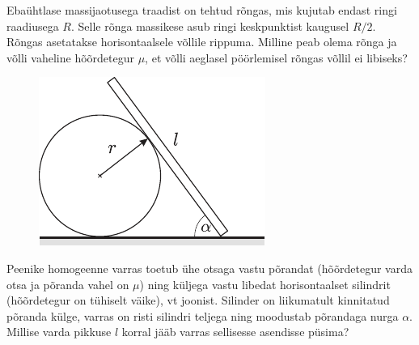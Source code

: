 \documentclass[10pt, twoside]{article}
\begin{document}
{%

Ebaühtlase massijaotusega traadist on tehtud rõngas, mis kujutab endast ringi raadiusega $R$. Selle rõnga massikese asub ringi keskpunktist
kaugusel $R/2$. Rõngas asetatakse horisontaalsele võllile rippuma. Milline peab
olema rõnga ja võlli vaheline hõõrdetegur $\mu$, et võlli aeglasel pöörlemisel rõngas
võllil ei libiseks?
\probend
\bigskip


\begin{figure}
	\begin{center}
		\vspace{-25pt}
		\includegraphics[width=\linewidth]{2008-v3g-09-yl}
	\end{center}
\end{figure}
Peenike homogeenne varras toetub ühe otsaga vastu põrandat (hõõrdetegur varda otsa ja põranda vahel on $\mu$) ning küljega vastu libedat horisontaalset silindrit (hõõrdetegur on tühiselt väike), vt joonist. Silinder on liikumatult kinnitatud põranda külge, varras on risti silindri teljega ning moodustab põrandaga nurga $\alpha$. Millise varda pikkuse $l$ korral jääb varras sellisesse asendisse püsima?
\probend
\bigskip


}
\end{document}
